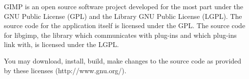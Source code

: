 GIMP is an open source software project developed for the most part under the
GNU Public License (GPL) and the Library GNU Public License (LGPL). The source
code for the application itself is licensed under the GPL. The source code for
libgimp, the library which communicates with plug-ins and which plug-ins link
with, is licensed under the LGPL.

You may download, install, build, make changes to the source code as provided
by these licenses (http://www.gnu.org/).
